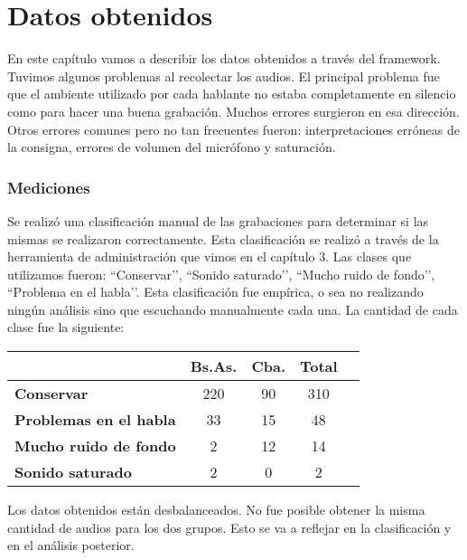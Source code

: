 \chapter{Datos obtenidos}

En este capítulo vamos a describir los datos obtenidos a través del framework. Tuvimos algunos problemas al recolectar los audios. El principal problema fue que el ambiente utilizado por cada hablante no estaba completamente en silencio como para hacer una buena grabación. Muchos errores surgieron en esa dirección. Otros errores comunes pero no tan frecuentes fueron: interpretaciones erróneas de la consigna, errores de volumen del micrófono y saturación. 

\subsection{Mediciones}

Se realizó una clasificación manual de las grabaciones para determinar si las mismas se realizaron correctamente. Esta clasificación se realizó a  través de la herramienta de administración que vimos en el capítulo 3. Las clases que utilizamos fueron: ``Conservar’’, ``Sonido saturado’’, ``Mucho ruido de fondo’’, ``Problema en el habla’’. Esta clasificación fue empírica, o sea no realizando ningún análisis sino que escuchando manualmente cada una. La cantidad de cada clase fue la siguiente:

\begin{table}[h]
\centering
\begin{tabular}{|l|c|c|c|c|}
\hline
\textbf{}  & \textbf{Bs.As. } & \textbf{Cba.} & \textbf{Total} \\ \hline
\textbf{Conservar}  & 220 & 90 & 310 \\ \hline
\textbf{Problemas en el habla}  & 33 & 15 & 48 \\ \hline
\textbf{Mucho ruido de fondo}  & 2 & 12 & 14 \\ \hline
\textbf{Sonido saturado}  & 2 & 0 & 2 \\ \hline
\end{tabular}
\end{table}

Los datos obtenidos están desbalanceados. No fue posible obtener la misma cantidad de audios para los dos grupos. Esto se va a reflejar en la clasificación y en el análisis posterior.

